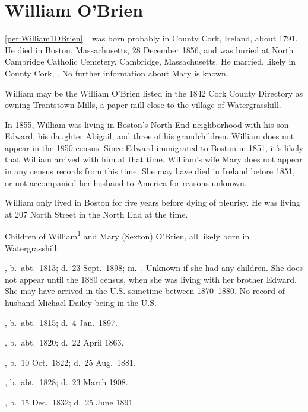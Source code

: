 \section{William O'Brien}

\ref{per:William1OBrien}.\  was born probably in County Cork, Ireland, about 1791.\cite{Census1855William} He died in Boston, Massachusetts, 28 December 1856,\cite{William1OBrienDeath} and was buried at North Cambridge Catholic Cemetery, Cambridge, Massachusetts.\cite{DianaBerberenaLetter1} He married, likely in County Cork, .\cite{Michael2OBrienDeath,Abigail2OBrienDeath,Ann2OBrienDeath,Mary2OBrienDeath} No further information about Mary is known.

William may be the William O'Brien listed in the 1842 Cork County Directory as owning Trantstown Mills, a paper mill close to the village of Watergrasshill.\cite{Jacksons}

In 1855, William was living in Boston's North End neighborhood with his son Edward, his daughter Abigail, and three of his grandchildren.\cite{Census1855William,Wards} William does not appear in the 1850 census. Since Edward immigrated to Boston in 1851\cite{Edward2OBrienNaturalization}, it's likely that William arrived with him at that time. William's wife Mary does not appear in any census records from this time. She may have died in Ireland before 1851, or not accompanied her husband to America for reasons unknown.

William only lived in Boston for five years before dying of pleurisy. He was living at 207 North Street in the North End at the time.\cite{William1OBrienDeath}

\begin{KidsIntro}
	Children of William\textsuperscript{1} and Mary (Sexton) O'Brien, all likely born in Watergrasshill:
\end{KidsIntro}

\begin{Kids}
	, b.\ abt.\ 1813\cite{1880CensusAnn}; d.\ 23 Sept.\ 1898; m.\ .\cite{Ann2OBrienDeath} Unknown if she had any children. She does not appear until the 1880 census, when she was living with her brother Edward. She may have arrived in the U.S. sometime between 1870--1880. No record of husband Michael Dailey being in the U.S.
	
	, b.\ abt.\ 1815; d.\ 4 Jan.\ 1897.
	
	, b.\ abt.\ 1820; d.\ 22 April 1863.
	
	, b.\ 10 Oct.\ 1822; d.\ 25 Aug.\ 1881.
		
	, b.\ abt.\ 1828; d.\ 23 March 1908.
	
	, b.\ 15 Dec.\ 1832; d.\ 25 June 1891.
			
\end{Kids}
